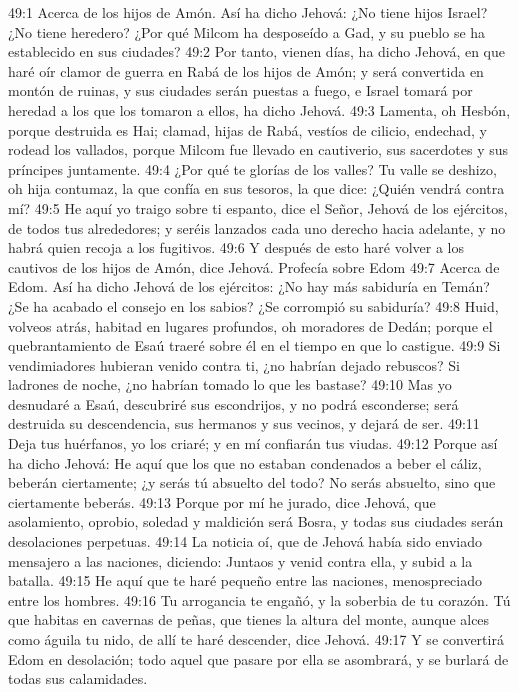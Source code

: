 49:1 Acerca de los hijos de Amón.  Así ha dicho Jehová: ¿No tiene hijos Israel? ¿No tiene heredero? ¿Por qué Milcom ha desposeído a Gad, y su pueblo se ha establecido en sus ciudades? 
49:2 Por tanto, vienen días, ha dicho Jehová, en que haré oír clamor de guerra en Rabá de los hijos de Amón; y será convertida en montón de ruinas, y sus ciudades serán puestas a fuego, e Israel tomará por heredad a los que los tomaron a ellos, ha dicho Jehová. 
49:3 Lamenta, oh Hesbón, porque destruida es Hai; clamad, hijas de Rabá, vestíos de cilicio, endechad, y rodead los vallados, porque Milcom fue llevado en cautiverio, sus sacerdotes y sus príncipes juntamente. 
49:4 ¿Por qué te glorías de los valles? Tu valle se deshizo, oh hija contumaz, la que confía en sus tesoros, la que dice: ¿Quién vendrá contra mí? 
49:5 He aquí yo traigo sobre ti espanto, dice el Señor, Jehová de los ejércitos, de todos tus alrededores; y seréis lanzados cada uno derecho hacia adelante, y no habrá quien recoja a los fugitivos. 
49:6 Y después de esto haré volver a los cautivos de los hijos de Amón, dice Jehová. 
Profecía sobre Edom 
49:7 Acerca de Edom. Así ha dicho Jehová de los ejércitos: ¿No hay más sabiduría en Temán? ¿Se ha acabado el consejo en los sabios? ¿Se corrompió su sabiduría? 
49:8 Huid, volveos atrás, habitad en lugares profundos, oh moradores de Dedán; porque el quebrantamiento de Esaú traeré sobre él en el tiempo en que lo castigue. 
49:9 Si vendimiadores hubieran venido contra ti, ¿no habrían dejado rebuscos? Si ladrones de noche, ¿no habrían tomado lo que les bastase? 
49:10 Mas yo desnudaré a Esaú, descubriré sus escondrijos, y no podrá esconderse; será destruida su descendencia, sus hermanos y sus vecinos, y dejará de ser. 
49:11 Deja tus huérfanos, yo los criaré; y en mí confiarán tus viudas. 
49:12 Porque así ha dicho Jehová: He aquí que los que no estaban condenados a beber el cáliz, beberán ciertamente; ¿y serás tú absuelto del todo? No serás absuelto, sino que ciertamente beberás. 
49:13 Porque por mí he jurado, dice Jehová, que asolamiento, oprobio, soledad y maldición será Bosra, y todas sus ciudades serán desolaciones perpetuas. 
49:14 La noticia oí, que de Jehová había sido enviado mensajero a las naciones, diciendo: Juntaos y venid contra ella, y subid a la batalla. 
49:15 He aquí que te haré pequeño entre las naciones, menospreciado entre los hombres. 
49:16 Tu arrogancia te engañó, y la soberbia de tu corazón. Tú que habitas en cavernas de peñas, que tienes la altura del monte, aunque alces como águila tu nido, de allí te haré descender, dice Jehová. 
49:17 Y se convertirá Edom en desolación; todo aquel que pasare por ella se asombrará, y se burlará de todas sus calamidades. 
